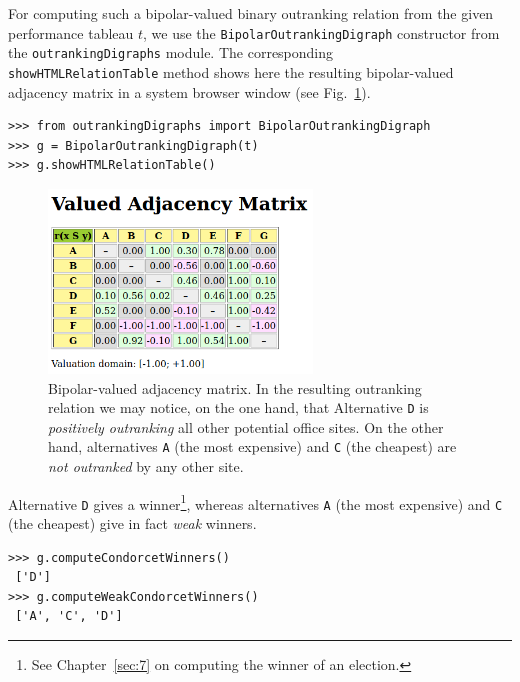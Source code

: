 For computing such a bipolar-valued binary outranking relation from the given performance tableau $t$, we use the \texttt{BipolarOutrankingDigraph} constructor from the \texttt{outrankingDigraphs} module. The corresponding\\
\texttt{showHTMLRelationTable} method shows here the resulting bipolar-valued adjacency matrix in a system browser window (see Fig.~\ref{fig:4.2}).
\begin{lstlisting}
>>> from outrankingDigraphs import BipolarOutrankingDigraph
>>> g = BipolarOutrankingDigraph(t)
>>> g.showHTMLRelationTable()
\end{lstlisting}
\begin{figure}[h]
\sidecaption[t]
\includegraphics[width=7cm]{Figures/officeChoiceOutranking.png}
\caption{Bipolar-valued adjacency matrix. In the resulting outranking relation we may notice, on the one hand, that Alternative \texttt{D} is \emph{positively outranking} all other potential office sites. On the other hand, alternatives \texttt{A} (the most expensive) and \texttt{C} (the cheapest) are \emph{not outranked} by any other site.}
\label{fig:4.2}       %
\end{figure}
Alternative \texttt{D} gives a \Condorcet winner\footnote{See Chapter~\ref{sec:7} on computing the winner of an election.}, whereas alternatives \texttt{A} (the most expensive) and \texttt{C} (the cheapest) give in fact \emph{weak} \Condorcet winners.
\begin{lstlisting}
>>> g.computeCondorcetWinners()
 ['D']
>>> g.computeWeakCondorcetWinners()
 ['A', 'C', 'D']
\end{lstlisting}


